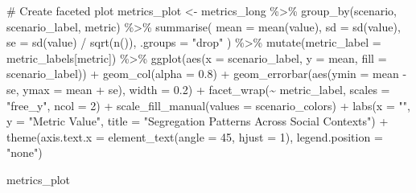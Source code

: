 \documentclass[
  11pt,
]{article}
\newenvironment{Shaded}{\begin{snugshade}}{\end{snugshade}}
\newcommand{\AttributeTok}[1]{\textcolor[rgb]{0.40,0.45,0.13}{#1}}
\newcommand{\CommentTok}[1]{\textcolor[rgb]{0.37,0.37,0.37}{#1}}
\newcommand{\DecValTok}[1]{\textcolor[rgb]{0.68,0.00,0.00}{#1}}
\newcommand{\FloatTok}[1]{\textcolor[rgb]{0.68,0.00,0.00}{#1}}
\newcommand{\FunctionTok}[1]{\textcolor[rgb]{0.28,0.35,0.67}{#1}}
\newcommand{\NormalTok}[1]{\textcolor[rgb]{0.00,0.23,0.31}{#1}}
\newcommand{\OtherTok}[1]{\textcolor[rgb]{0.00,0.23,0.31}{#1}}
\newcommand{\SpecialCharTok}[1]{\textcolor[rgb]{0.37,0.37,0.37}{#1}}
\newcommand{\StringTok}[1]{\textcolor[rgb]{0.13,0.47,0.30}{#1}}
\begin{document}
\begin{Shaded}
\begin{Highlighting}[]
\CommentTok{\# Create faceted plot}
\NormalTok{metrics\_plot }\OtherTok{\textless{}{-}}\NormalTok{ metrics\_long }\SpecialCharTok{\%\textgreater{}\%}
  \FunctionTok{group\_by}\NormalTok{(scenario, scenario\_label, metric) }\SpecialCharTok{\%\textgreater{}\%}
  \FunctionTok{summarise}\NormalTok{(}
    \AttributeTok{mean =} \FunctionTok{mean}\NormalTok{(value),}
    \AttributeTok{sd =} \FunctionTok{sd}\NormalTok{(value),}
    \AttributeTok{se =} \FunctionTok{sd}\NormalTok{(value) }\SpecialCharTok{/} \FunctionTok{sqrt}\NormalTok{(}\FunctionTok{n}\NormalTok{()),}
    \AttributeTok{.groups =} \StringTok{"drop"}
\NormalTok{  ) }\SpecialCharTok{\%\textgreater{}\%}
  \FunctionTok{mutate}\NormalTok{(}\AttributeTok{metric\_label =}\NormalTok{ metric\_labels[metric]) }\SpecialCharTok{\%\textgreater{}\%}
  \FunctionTok{ggplot}\NormalTok{(}\FunctionTok{aes}\NormalTok{(}\AttributeTok{x =}\NormalTok{ scenario\_label, }\AttributeTok{y =}\NormalTok{ mean, }\AttributeTok{fill =}\NormalTok{ scenario\_label)) }\SpecialCharTok{+}
  \FunctionTok{geom\_col}\NormalTok{(}\AttributeTok{alpha =} \FloatTok{0.8}\NormalTok{) }\SpecialCharTok{+}
  \FunctionTok{geom\_errorbar}\NormalTok{(}\FunctionTok{aes}\NormalTok{(}\AttributeTok{ymin =}\NormalTok{ mean }\SpecialCharTok{{-}}\NormalTok{ se, }\AttributeTok{ymax =}\NormalTok{ mean }\SpecialCharTok{+}\NormalTok{ se), }\AttributeTok{width =} \FloatTok{0.2}\NormalTok{) }\SpecialCharTok{+}
  \FunctionTok{facet\_wrap}\NormalTok{(}\SpecialCharTok{\textasciitilde{}}\NormalTok{ metric\_label, }\AttributeTok{scales =} \StringTok{"free\_y"}\NormalTok{, }\AttributeTok{ncol =} \DecValTok{2}\NormalTok{) }\SpecialCharTok{+}
  \FunctionTok{scale\_fill\_manual}\NormalTok{(}\AttributeTok{values =}\NormalTok{ scenario\_colors) }\SpecialCharTok{+}
  \FunctionTok{labs}\NormalTok{(}\AttributeTok{x =} \StringTok{""}\NormalTok{, }\AttributeTok{y =} \StringTok{"Metric Value"}\NormalTok{, }
       \AttributeTok{title =} \StringTok{"Segregation Patterns Across Social Contexts"}\NormalTok{) }\SpecialCharTok{+}
  \FunctionTok{theme}\NormalTok{(}\AttributeTok{axis.text.x =} \FunctionTok{element\_text}\NormalTok{(}\AttributeTok{angle =} \DecValTok{45}\NormalTok{, }\AttributeTok{hjust =} \DecValTok{1}\NormalTok{),}
        \AttributeTok{legend.position =} \StringTok{"none"}\NormalTok{)}

\NormalTok{metrics\_plot}
\end{Highlighting}
\end{Shaded}
\end{document}
